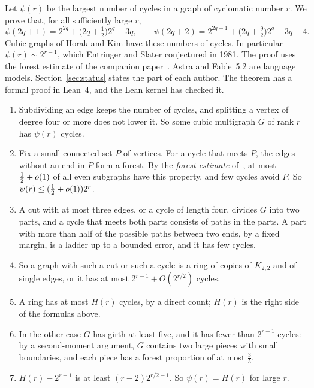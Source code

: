 \documentclass[11pt]{article}
\begin{document}
\maketitleblock

Let $\psi(r)$ be the largest number of cycles in a graph of cyclomatic number $r$. We prove that,
for all sufficiently large $r$,
\[
  \psi(2q+1)=2^{2q}+\bigl(2q+\tfrac12\bigr)2^{q}-3q,\qquad
  \psi(2q+2)=2^{2q+1}+\bigl(2q+\tfrac92\bigr)2^{q}-3q-4 .
\]
Cubic graphs of Horak and Kim have these numbers of cycles. In particular
$\psi(r)\sim2^{r-1}$, which Entringer and Slater conjectured in 1981. The proof uses the
forest estimate of the companion paper~\cite{Forest}. Astra and Fable~5.2 are language models. Section~\ref{sec:status} states the part of each author. The theorem has a
formal proof in Lean~4, and the Lean kernel has checked it.

\begin{enumerate}[leftmargin=1.6em]
\item Subdividing an edge keeps the number of cycles, and splitting a vertex of degree four or
more does not lower it. So some cubic multigraph $G$ of rank $r$ has $\psi(r)$ cycles.
\item Fix a small connected set $P$ of vertices. For a cycle that meets $P$, the edges without
an end in $P$ form a forest. By the \emph{forest estimate} of~\cite{Forest}, at most
$\tfrac12+o(1)$ of all even subgraphs have this property, and few cycles avoid $P$. So
$\psi(r)\le(\tfrac12+o(1))2^{r}$.
\item A cut with at most three edges, or a cycle of length four, divides $G$ into two parts,
and a cycle that meets both parts consists of paths in the parts. A part with more than half of
the possible paths between two ends, by a fixed margin, is a ladder up to a bounded error, and
it has few cycles.
\item So a graph with such a cut or such a cycle is a ring of copies of $K_{2,2}$ and of single
edges, or it has at most $2^{r-1}+O(2^{r/2})$ cycles.
\item A ring has at most $H(r)$ cycles, by a direct count; $H(r)$ is the right side of the
formulas above.
\item In the other case $G$ has girth at least five, and it has fewer than $2^{r-1}$ cycles:
by a second-moment argument, $G$ contains two large pieces with small boundaries, and each piece
has a forest proportion of at most $\frac35$.
\item $H(r)-2^{r-1}$ is at least $(r-2)2^{r/2-1}$. So $\psi(r)=H(r)$ for large $r$.
\end{enumerate}

\contentsblock
\end{document}
